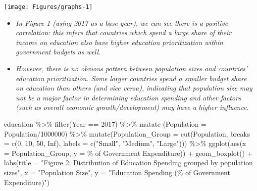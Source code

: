 \documentclass[
]{article}
\newenvironment{Shaded}{\begin{snugshade}}{\end{snugshade}}
\newcommand{\AttributeTok}[1]{\textcolor[rgb]{0.77,0.63,0.00}{#1}}
\newcommand{\ConstantTok}[1]{\textcolor[rgb]{0.00,0.00,0.00}{#1}}
\newcommand{\DecValTok}[1]{\textcolor[rgb]{0.00,0.00,0.81}{#1}}
\newcommand{\FunctionTok}[1]{\textcolor[rgb]{0.00,0.00,0.00}{#1}}
\newcommand{\NormalTok}[1]{#1}
\newcommand{\SpecialCharTok}[1]{\textcolor[rgb]{0.00,0.00,0.00}{#1}}
\newcommand{\StringTok}[1]{\textcolor[rgb]{0.31,0.60,0.02}{#1}}
\providecommand{\tightlist}{%
  \setlength{\itemsep}{0pt}\setlength{\parskip}{0pt}}
\begin{document}
\begin{center}\texttt{[image: Figures/graphs-1]} \end{center}

\begin{itemize}
\tightlist
\item
  \emph{In Figure 1 (using 2017 as a base year), we can see there is a positive correlation: this infers that countries which spend a large share of their income on education also have higher education prioritization within government budgets as well.}
\item
  \emph{However, there is no obvious pattern between population sizes and countries' education prioritization. Some larger countries spend a smaller budget share on education than others (and vice versa), indicating that population size may not be a major factor in determining education spending and other factors (such as overall economic growth/development) may have a higher influence.}
\end{itemize}

\begin{Shaded}
\begin{Highlighting}[]
\NormalTok{education }\SpecialCharTok{\%\textgreater{}\%} \FunctionTok{filter}\NormalTok{(Year }\SpecialCharTok{==} \DecValTok{2017}\NormalTok{) }\SpecialCharTok{\%\textgreater{}\%}
  \FunctionTok{mutate}\NormalTok{ (}\AttributeTok{Population =}\NormalTok{ Population}\SpecialCharTok{/}\DecValTok{1000000}\NormalTok{) }\SpecialCharTok{\%\textgreater{}\%}
  \FunctionTok{mutate}\NormalTok{(}\AttributeTok{Population\_Group =} \FunctionTok{cut}\NormalTok{(Population, }\AttributeTok{breaks =} \FunctionTok{c}\NormalTok{(}\DecValTok{0}\NormalTok{, }\DecValTok{10}\NormalTok{, }\DecValTok{50}\NormalTok{, }\ConstantTok{Inf}\NormalTok{),}
                                \AttributeTok{labels =} \FunctionTok{c}\NormalTok{(}\StringTok{"Small"}\NormalTok{, }\StringTok{"Medium"}\NormalTok{, }\StringTok{"Large"}\NormalTok{))) }\SpecialCharTok{\%\textgreater{}\%}
  \FunctionTok{ggplot}\NormalTok{(}\FunctionTok{aes}\NormalTok{(}\AttributeTok{x =}\NormalTok{ Population\_Group,}
             \AttributeTok{y =} \StringTok{\textasciigrave{}}\AttributeTok{\% of Government Expenditure}\StringTok{\textasciigrave{}}\NormalTok{)) }\SpecialCharTok{+}
\FunctionTok{geom\_boxplot}\NormalTok{() }\SpecialCharTok{+}
  \FunctionTok{labs}\NormalTok{(}\AttributeTok{title =} \StringTok{"Figure 2: Distribution of Education Spending grouped by population sizes"}\NormalTok{,}
       \AttributeTok{x =} \StringTok{"Population Size"}\NormalTok{,}
       \AttributeTok{y =} \StringTok{"Education Spending (\% of Government Expenditure)"}\NormalTok{) }
\end{Highlighting}
\end{Shaded}
\end{document}
